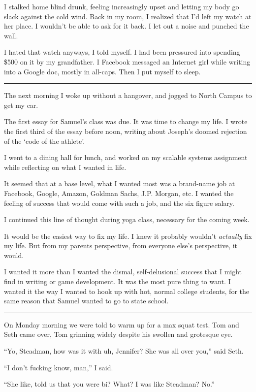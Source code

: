 I stalked home blind drunk, feeling increasingly upset and letting my body go
slack against the cold wind.  Back in my room, I realized that I'd left my watch
at her place.  I wouldn't be able to ask for it back.  I let out a noise and
punched the wall. 

I hated that watch anyways, I told myself. I had been pressured into spending
\$500 on it by my grandfather.  I Facebook messaged an Internet girl while
writing into a Google doc, mostly in all-caps.  Then I put myself to sleep.

\plainfancybreak{12pt}{2}{* * *}

The next morning I woke up without a hangover, and jogged to North Campus to get
my car.  

The first essay for Samuel's class was due.  It was time to change my life.  I
wrote the first third of the essay before noon, writing about Joseph's doomed
rejection of the `code of the athlete'.

I went to a dining hall for lunch, and worked on my scalable systems assignment
while reflecting on what I wanted in life.

It seemed that at a base level, what I wanted most was a brand-name job at
Facebook, Google, Amazon, Goldman Sachs, J.P.  Morgan, etc.  I wanted the
feeling of success that would come with such a job, and the six figure salary.

I continued this line of thought during yoga class, necessary for the coming
week.

It would be the easiest way to fix my life.  I knew it probably wouldn't
\textit{actually} fix my life.  But from my parents perspective, from everyone
else's perspective, it would.  

I wanted it more than I wanted the dismal, self-delusional success that I might
find in writing or game development.  It was the most pure thing to want. I
wanted it the way I wanted to hook up with hot, normal college students, for the
same reason that Samuel wanted to go to state school. 

\plainfancybreak{12pt}{2}{* * *}

On Monday morning we were told to warm up for a max squat test.  Tom and Seth
came over, Tom grinning widely despite his swollen and grotesque eye.

``Yo, Steadman, how was it with uh, Jennifer?  She was all over you,'' said
Seth.

``I don't fucking know, man,'' I said.

``She like, told us that you were bi?  What?  I was like Steadman?  No.''

